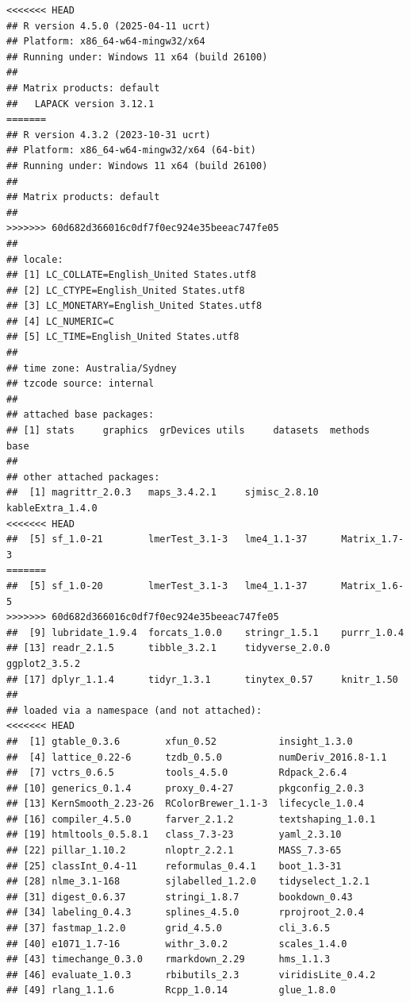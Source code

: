 \documentclass[
]{article}
\begin{document}
\begin{verbatim}
<<<<<<< HEAD
## R version 4.5.0 (2025-04-11 ucrt)
## Platform: x86_64-w64-mingw32/x64
## Running under: Windows 11 x64 (build 26100)
## 
## Matrix products: default
##   LAPACK version 3.12.1
=======
## R version 4.3.2 (2023-10-31 ucrt)
## Platform: x86_64-w64-mingw32/x64 (64-bit)
## Running under: Windows 11 x64 (build 26100)
## 
## Matrix products: default
## 
>>>>>>> 60d682d366016c0df7f0ec924e35beeac747fe05
## 
## locale:
## [1] LC_COLLATE=English_United States.utf8 
## [2] LC_CTYPE=English_United States.utf8   
## [3] LC_MONETARY=English_United States.utf8
## [4] LC_NUMERIC=C                          
## [5] LC_TIME=English_United States.utf8    
## 
## time zone: Australia/Sydney
## tzcode source: internal
## 
## attached base packages:
## [1] stats     graphics  grDevices utils     datasets  methods   base     
## 
## other attached packages:
##  [1] magrittr_2.0.3   maps_3.4.2.1     sjmisc_2.8.10    kableExtra_1.4.0
<<<<<<< HEAD
##  [5] sf_1.0-21        lmerTest_3.1-3   lme4_1.1-37      Matrix_1.7-3    
=======
##  [5] sf_1.0-20        lmerTest_3.1-3   lme4_1.1-37      Matrix_1.6-5    
>>>>>>> 60d682d366016c0df7f0ec924e35beeac747fe05
##  [9] lubridate_1.9.4  forcats_1.0.0    stringr_1.5.1    purrr_1.0.4     
## [13] readr_2.1.5      tibble_3.2.1     tidyverse_2.0.0  ggplot2_3.5.2   
## [17] dplyr_1.1.4      tidyr_1.3.1      tinytex_0.57     knitr_1.50      
## 
## loaded via a namespace (and not attached):
<<<<<<< HEAD
##  [1] gtable_0.3.6        xfun_0.52           insight_1.3.0      
##  [4] lattice_0.22-6      tzdb_0.5.0          numDeriv_2016.8-1.1
##  [7] vctrs_0.6.5         tools_4.5.0         Rdpack_2.6.4       
## [10] generics_0.1.4      proxy_0.4-27        pkgconfig_2.0.3    
## [13] KernSmooth_2.23-26  RColorBrewer_1.1-3  lifecycle_1.0.4    
## [16] compiler_4.5.0      farver_2.1.2        textshaping_1.0.1  
## [19] htmltools_0.5.8.1   class_7.3-23        yaml_2.3.10        
## [22] pillar_1.10.2       nloptr_2.2.1        MASS_7.3-65        
## [25] classInt_0.4-11     reformulas_0.4.1    boot_1.3-31        
## [28] nlme_3.1-168        sjlabelled_1.2.0    tidyselect_1.2.1   
## [31] digest_0.6.37       stringi_1.8.7       bookdown_0.43      
## [34] labeling_0.4.3      splines_4.5.0       rprojroot_2.0.4    
## [37] fastmap_1.2.0       grid_4.5.0          cli_3.6.5          
## [40] e1071_1.7-16        withr_3.0.2         scales_1.4.0       
## [43] timechange_0.3.0    rmarkdown_2.29      hms_1.1.3          
## [46] evaluate_1.0.3      rbibutils_2.3       viridisLite_0.4.2  
## [49] rlang_1.1.6         Rcpp_1.0.14         glue_1.8.0         

\end{verbatim}
\end{document}
